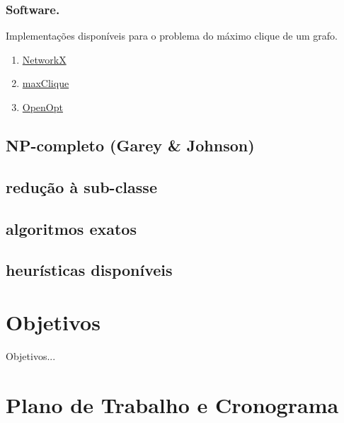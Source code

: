 \documentclass[12pt]{article}
\begin{document}
\subsubsection{Software.}

Implementações disponíveis para o problema do máximo clique de um grafo.

\begin{enumerate}
\item \href{http://networkx.github.io/documentation/development/reference/generated/networkx.algorithms.approximation.clique.max_clique.html}{NetworkX}
\item \href{http://www.dcs.gla.ac.uk/~pat/maxClique/distribution/readme.txt}{maxClique}
\item \href{http://openopt.org/MCP}{OpenOpt}
\end{enumerate}


\subsection{NP-completo (Garey \& Johnson)}

\subsection{redução à sub-classe}

\subsection{algoritmos exatos}

\subsection{heurísticas disponíveis}


\section{Objetivos}
\label{sec:objetivos}

Objetivos...

\section{Plano de Trabalho e Cronograma}
\label{sec:plano}
\end{document}
